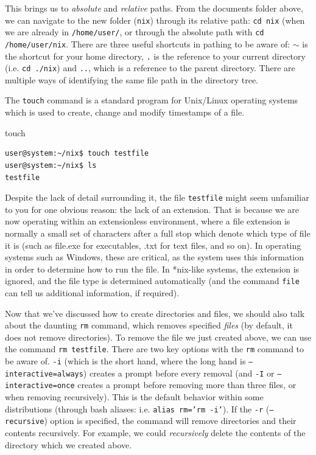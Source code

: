 \documentclass[11pt]{article}
\begin{document}
This brings us to \emph{absolute} and \emph{relative} paths. From the documents folder above, we can navigate to the new folder (\texttt{nix}) through its relative path: \texttt{cd nix} (when we are already in \texttt{/home/user/}, or through the absolute path with \texttt{cd /home/user/nix}. There are three useful shortcuts in pathing to be aware of: $\sim$ is the shortcut for your home directory, \texttt{.} is the reference to your current directory (i.e. \texttt{cd ./nix}) and \texttt{..}, which is a reference to the parent directory. There are multiple ways of identifying the same file path in the directory tree.

The \texttt{touch} command is a standard program for Unix/Linux operating systems which is used to create, change and modify timestamps of a file.\\

\begin{listing}[H]
\caption{touch}\vspace{-0.1in}
\begin{verbatim}
user@system:~/nix$ touch testfile
user@system:~/nix$ ls
testfile
\end{verbatim}
\end{listing}

Despite the lack of detail surrounding it, the file \texttt{testfile} might seem unfamiliar to you for one obvious reason: the lack of an extension. That is because we are now operating within an extensionless environment, where a file extension is normally a small set of characters after a full stop which denote which type of file it is (such as file.exe for executables, .txt for text files, and so on). In operating systems such as Windows, these are critical, as the system uses this information in order to determine how to run the file. In *nix-like systems, the extension is ignored, and the file type is determined automatically (and the command \texttt{file} can tell us additional information, if required).

Now that we've discussed how to create directories and files, we should also talk about the daunting \texttt{rm} command, which removes specified \emph{files} (by default, it does not remove directories). To remove the file we just created above, we can use the command \texttt{rm testfile}. There are two key options with the \texttt{rm} command to be aware of. \texttt{-i} (which is the short hand, where the long hand is \texttt{--interactive=always}) creates a prompt before every removal (and \texttt{-I} or \texttt{--interactive=once} creates a prompt before removing more than three files, or when removing recursively). This is the default behavior within some distributions (through bash aliases: i.e. \texttt{alias rm='rm -i'}). If the \texttt{-r} (\texttt{--recursive}) option is specified, the command will remove directories and their contents recursively. For example, we could \emph{recursively} delete the contents of the directory which we created above. \\
\end{document}

